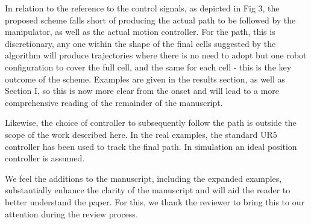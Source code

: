 \documentclass[11pt]{article}
\begin{document}
\begin{enumerate}[I.]
In relation to the reference to the control signals, as depicted in Fig 3, the proposed scheme falls short of producing the actual path to be followed by the manipulator, as well as the actual motion controller. For the path, this is discretionary, any one within the shape of the final cells suggested by the algorithm will produce 
trajectories where there is no need to adopt but one robot configuration to cover the full cell, and the same for each cell - this is the key outcome of the scheme. Examples are given in the results section, as well as Section I, so this is now more clear from the onset and will lead to a more comprehensive reading of the 
remainder of the manuscript. 

Likewise, the choice of controller to subsequently follow the path is outside the scope of the work described here. In the real examples, the standard UR5 controller has been used to track the final path. In simulation an ideal position controller is assumed.

We feel the additions to the manuscript, including the expanded examples, substantially enhance the clarity of the manuscript and will aid the reader to better understand the paper. For this, we thank the reviewer to bring this to our attention during the review process.

  

\end{enumerate}
\end{document}
